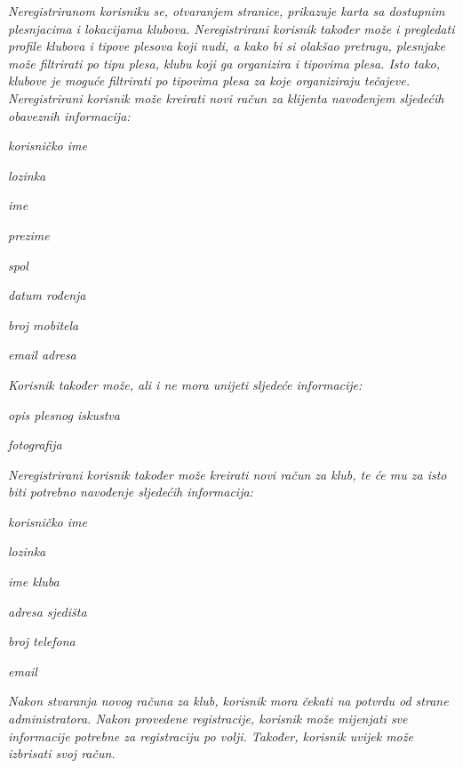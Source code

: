 \textit{Neregistriranom korisniku se, otvaranjem stranice, prikazuje karta sa dostupnim plesnjacima i lokacijama klubova. Neregistrirani korisnik također može i pregledati profile klubova i tipove plesova koji nudi, a kako bi si olakšao pretragu, plesnjake može filtrirati po tipu plesa, klubu koji ga organizira i tipovima plesa. Isto tako, klubove je moguće filtrirati po tipovima plesa za koje organiziraju tečajeve. 
	Neregistrirani korisnik može kreirati novi račun za klijenta navođenjem sljedećih obaveznih informacija:
}
\begin{packed_item}
	\item \textit{korisničko ime}
	\item \textit{lozinka}
	\item \textit{ime}
	\item \textit{prezime}
	\item \textit{spol}
	\item \textit{datum rođenja}
	\item \textit{broj mobitela}
	\item \textit{email adresa}
\end{packed_item}

\textit{Korisnik također može, ali i ne mora unijeti sljedeće informacije:}

\begin{packed_item}
	\item \textit{opis plesnog iskustva}
	\item \textit{fotografija}
\end{packed_item}

\textit{Neregistrirani korisnik također može kreirati novi račun za klub, te će mu za isto biti potrebno navođenje sljedećih informacija:}

\begin{packed_item}
	\item \textit{korisničko ime}
	\item \textit{lozinka}
	\item \textit{ime kluba}
	\item \textit{adresa sjedišta}
	\item \textit{broj telefona}
	\item \textit{email}
\end{packed_item}

\textit{Nakon stvaranja novog računa za klub, korisnik mora čekati na potvrdu od strane administratora.  Nakon provedene registracije, korisnik može mijenjati sve informacije potrebne za registraciju po volji. Također, korisnik uvijek može izbrisati svoj račun.}

